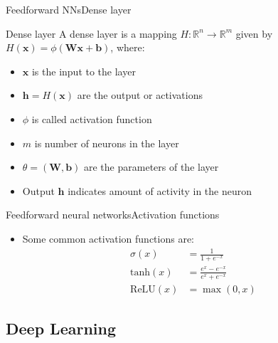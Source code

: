\documentclass[handout]{beamer}
\theoremstyle{definition}
\theoremstyle{remark}
\newcommand*{\V}[1]{\mathbf{#1}}%
\begin{document}
\begin{frame}{Feedforward NNs}{Dense layer}
  \begin{block}{Dense layer}
   A dense layer is a mapping $H:\mathbb{R}^n \rightarrow \mathbb{R}^m$ given by $H(\V{x}) = \phi(\V{Wx}+\V{b})$, where:
   
   \begin{itemize}
       \item $\V{x}$ is the input to the layer
       \item $\V{h} = H(\V{x})$ are the output or activations
       \item $\phi$ is called activation function
       \item $m$ is number of neurons in the layer
       \item $\theta = (\V{W, b})$ are the parameters of the layer 
   \end{itemize}
  \end{block}
  \begin{itemize}
      \item Output $\V{h}$ indicates \alert{amount of activity} in the neuron
  \end{itemize}
\end{frame}

\begin{frame}{Feedforward neural networks}{Activation functions}
\begin{itemize}
    \item Some common activation functions are:
  \begin{align*}
    \sigma(x) &= \frac{1}{1+e^{-x}}\\
    \text{tanh}(x) &= \frac{e^x - e^{-x}}{e^x + e^{-x}}\\
    \text{ReLU}(x) &= \max(0, x)
  \end{align*}
  
   
\end{itemize}
  
\end{frame}

\subsection{Deep Learning}
\end{document}
